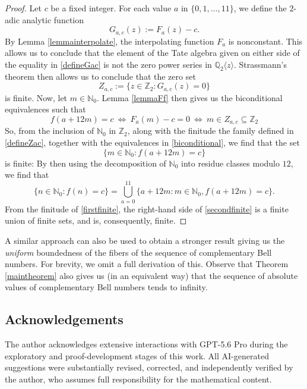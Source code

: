 \documentclass[11pt,letterpaper]{amsart}
\begin{document}
\begin{proof}
 Let $c$ be a fixed integer. For each value $ a$ in $ \{ 0, 1, \ldots, 11 \}$, 
 we define the $2$-adic analytic function 
\begin{equation}\label{defineGac} 
 G_{a, c}(z) := F_{a}(z) - c. 
\end{equation}
 By Lemma \ref{lemmainterpolate}, 
 the interpolating function $F_{a}$ is nonconstant. 
 This allows us to conclude that 
 the element of the Tate algebra given on either side of the equality in \eqref{defineGac} 
 is not the zero power series in $\mathbb{Q}_{2}\langle z \rangle$. 
 Strassmann's theorem then allows us to conclude that the zero set
\begin{equation}\label{defineZac}
 Z_{a, c} := \{ z \in \mathbb{Z}_{2} : G_{a, c}(z) = 0 \} 
\end{equation}
 is finite. 
 Now, let $m \in \mathbb{N}_{0}$. 
 Lemma \ref{lemmaFf} then gives us the biconditional equivalences such that 
\begin{equation}\label{biconditional}
 f(a+12m) = c 
 \ \Longleftrightarrow 
 \ F_{a}(m) - c = 0 
 \ \Longleftrightarrow \ m \in Z_{a, c} \subseteq \mathbb{Z}_{2}
\end{equation}
 So, from the inclusion of $\mathbb{N}_{0}$ in $\mathbb{Z}_{2}$, 
 along with the finitude the family defined in \eqref{defineZac}, together with the equivalences in 
 \eqref{biconditional}, we find that the set 
\begin{equation}\label{firstfinite}
 \{ m \in \mathbb{N}_{0} : f(a + 12 m) = c \} 
\end{equation}
 is finite: 
 By then using the decomposition of $\mathbb{N}_{0}$ into residue classes modulo $12$, 
 we find that 
\begin{equation}\label{secondfinite} 
 \{ n \in \mathbb{N}_{0} : f(n) = c \} 
 = \bigcup_{a=0}^{11} \{ a + 12 m : m \in \mathbb{N}_{0}, f(a + 12 m) = c \}.
\end{equation}
 From the finitude of \eqref{firstfinite}, 
 the right-hand side of \eqref{secondfinite} 
 is a finite union of finite sets, and is, consequently, finite. 
\end{proof}

 A similar approach can also be used to obtain a stronger result giving us the \emph{uniform} boundedness of the fibers of the sequence 
 of complementary Bell numbers. For brevity, we omit a full derivation of this. 
 Observe that Theorem \ref{maintheorem} also gives us (in an equivalent way) that 
 the sequence of absolute values of complementary Bell numbers tends to infinity. 

\subsection*{Acknowledgements}
 The author acknowledges extensive interactions with GPT-5.6 
 Pro during the exploratory and proof-development stages of this work. All AI-generated suggestions were 
 substantially revised, corrected, and independently verified by the author, who assumes full responsibility for the mathematical content.



\end{document}
